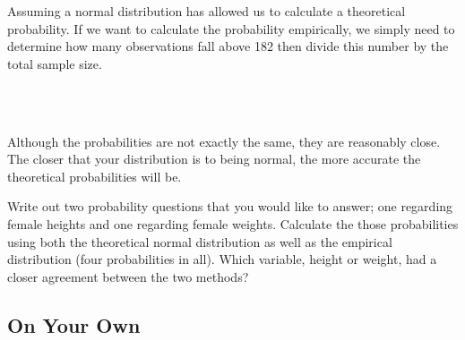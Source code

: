 \documentclass[11pt]{article}
\begin{document}
Assuming a normal distribution has allowed us to calculate a theoretical probability.  If we want to calculate the probability empirically, we simply need to determine how many observations fall above 182 then divide this number by the total sample size.

\ttfamily\noindent
\hlstd{}\hspace*{\fill}\\
\hlstd{}\hlkeyword{(}\hlkeyword{\usebox{\hlnormalsizeboxgreaterthan}}{\ }\hlkeyword{)}{\ }\hlkeyword{/}{\ }\hlkeyword{(}\hlkeyword{)}
\hspace*{\fill}\\
\normalfont

Although the probabilities are not exactly the same, they are reasonably close. The closer that your distribution is to being normal, the more accurate the theoretical probabilities will be.

\begin{exercise}
Write out two probability questions that you would like to answer; one regarding female heights and one regarding female weights.  Calculate the those probabilities using both the theoretical normal distribution as well as the empirical distribution (four probabilities in all).  Which variable, height or weight, had a closer agreement between the two methods?
\end{exercise}

\newpage

%

\subsection*{On Your Own}
\end{document}
